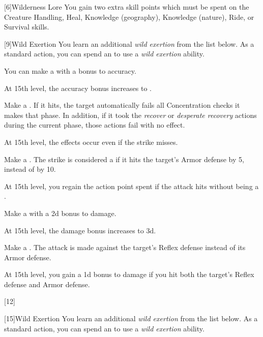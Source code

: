             [6]{Wilderness Lore} You gain two extra skill points which must be spent on the Creature Handling, Heal, Knowledge (geography), Knowledge (nature), Ride, or Survival skills.

            [9]{Wild Exertion}
            You learn an additional \textit{wild exertion} from the list below.
            As a standard action, you can spend an  to use a \textit{wild exertion} ability.
            {
                 You can make a  with a  bonus to accuracy.

                At 15th level, the accuracy bonus increases to .

                 Make a .
                If it hits, the target automatically fails all Concentration checks it makes that phase.
                In addition, if it took the \textit{recover} or \textit{desperate recovery} actions during the current phase, those actions fail with no effect.

                At 15th level, the effects occur even if the strike misses.

                 Make a .
                The strike is considered a  if it hits the target's Armor defense by 5, instead of by 10.

                At 15th level, you regain the action point spent if the attack hits without being a .

                 Make a  with a \plus2d bonus to damage.

                At 15th level, the damage bonus increases to \plus3d.

                 Make a .
                The attack is made against the target's Reflex defense instead of its Armor defense.

                At 15th level, you gain a \plus1d bonus to damage if you hit both the target's Reflex defense and Armor defense.
            }

            [12]{} 

            [15]{Wild Exertion} 
            You learn an additional \textit{wild exertion} from the list below.
            As a standard action, you can spend an  to use a \textit{wild exertion} ability.
            {
            }

